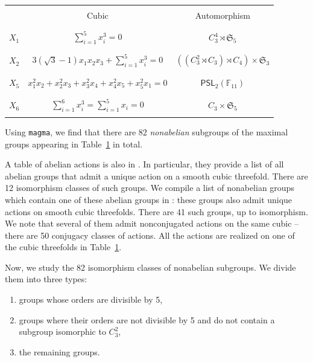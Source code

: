 \documentclass[12pt,reqno]{amsart}
\theoremstyle{plain}
\theoremstyle{remark}
\theoremstyle{definition}
\numberwithin{equation}{section}
\def\fS{{\mathfrak S}}
\def\fS{{\mathfrak S}}
\def\PSL{\mathsf{PSL}}
\begin{document}
\begin{table}[H]
\begin{tabular}{|c|c|c|}
\hline &&\\[-0.4cm]
        & Cubic & Automorphism\\[-0.5cm] && \\\hline &&\\[-0.3cm]
    $X_1$ & $\sum_{i=1}^5 x_i^3=0$ & $C_3^4\rtimes \fS_5$\\[-0.3cm] && \\\hline &&\\[-0.3cm]
  $X_2$&$ 3(\sqrt{3}-1)x_1x_2x_3+\sum_{i=1}^5 x_i^3=0$ & $((C_3^2\rtimes C_3)\rtimes C_4)\times \fS_3$\\[-0.3cm] && \\\hline &&\\[-0.3cm]
$X_5$ & $x_1^2x_2+x_2^2x_3+x_3^2x_4+x_4^2x_5+x_5^2x_1=0$&$\PSL_2(\mathbb F_{11})$\\[-0.3cm] && \\\hline &&\\[-0.3cm]
        $X_6$ &$\sum_{i=1}^6x_i^3=\sum_{i=1}^5x_i=0$&$C_3\times \fS_5$\\[-0.3cm] && \\\hline
\end{tabular}
\vskip 0.2cm
\caption{}\label{table:cubic}
\end{table}

Using {\tt magma}, we find that there are 82 {\em nonabelian} subgroups of the maximal groups appearing in Table~\ref{table:cubic} in total. 

A table of abelian actions is also in \cite[Appendix B]{wei-yu}. 
In particular, they provide a list of all abelian groups that admit a unique action on a smooth cubic threefold. There are 12 isomorphism classes of such groups. We compile a list of nonabelian groups which contain one of these abelian groups in \cite{CTZuni-tables}: these groups also admit unique actions on smooth cubic threefolds. 
 There are 41 such groups, up to isomorphism. We note that several of them admit nonconjugated actions on the same cubic -- there are 50 conjugacy classes of actions. All the actions are realized on one of the cubic threefolds in Table~\ref{table:cubic}.


Now, we study the 82 isomorphism classes of nonabelian subgroups. We divide them into three types:
\begin{enumerate}
    \item groups whose orders are divisible by 5, 
    \item groups where their orders are not divisible by 5 and do not contain a subgroup isomorphic to $C_3^2$,
    \item the remaining groups.
\end{enumerate}
\end{document}
